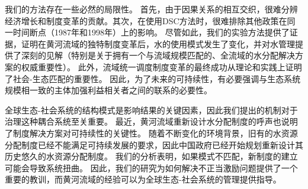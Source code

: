 我们的方法存在一些必然的局限性。
首先，由于因果关系的相互交织，很难分辨经济增长和制度变革的贡献。其次，在使用DSC方法时，很难排除其他政策在同一时间断点（1987年和1998年）上的影响。
尽管如此，我们的实验方法提供了证据，证明在黄河流域的独特制度变革后，水的使用模式发生了变化，并对水管理提供了深刻的见解（特别是关于拥有一个与流域规模匹配的、全流域的水分配解决方案的权威重要性）\cite{bodin2017b, ostrom2009, reyers2018}。
此外，流域统一调度制度变革的最终成功从理论和实践上证明了社会-生态匹配的重要性。
因此，为了未来的可持续性，有必要强调与生态系统规模相一致的主体加强利益相关者之间的联系的必要性。

全球生态-社会系统的结构模式是影响结果的关键因素，因此我们提出的机制对于治理这种耦合系统至关重要。
最近，黄河流域重新设计水分配制度的呼声也说明了制度解决方案对可持续性的关键性。
随着不断变化的环境背景，旧有的水资源分配制度已经不能满足可持续发展的要求，因此中国政府已经开始规划重新设计其历史悠久的水资源分配制度\cite{wang2019a}。
我们的分析表明，如果模式不匹配，新制度的建立可能会导致系统扭曲。
因此，我们的研究为如何解决不正当激励问题提供了一个重要的教训，而黄河流域的经验可以为全球生态-社会系统的管理提供指导\cite{hegwood2022, muneepeerakul2017, leslie2015}。
